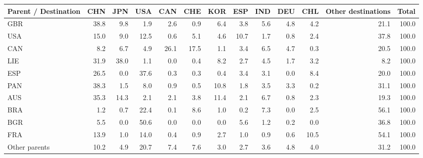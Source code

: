 \begin{tabular}{lrrrrrrrrrrrr}
\toprule
Parent / Destination & CHN & JPN & USA & CAN & CHE & KOR & ESP & IND & DEU & CHL & Other destinations & Total \\
\midrule
GBR & 38.8 & 9.8 & 1.9 & 2.6 & 0.9 & 6.4 & 3.8 & 5.6 & 4.8 & 4.2 & 21.1 & 100.0 \\
USA & 15.0 & 9.0 & 12.5 & 0.6 & 5.1 & 4.6 & 10.7 & 1.7 & 0.8 & 2.4 & 37.8 & 100.0 \\
CAN & 8.2 & 6.7 & 4.9 & 26.1 & 17.5 & 1.1 & 3.4 & 6.5 & 4.7 & 0.3 & 20.5 & 100.0 \\
LIE & 31.9 & 38.0 & 1.1 & 0.0 & 0.4 & 8.2 & 2.7 & 4.5 & 1.7 & 3.2 & 8.2 & 100.0 \\
ESP & 26.5 & 0.0 & 37.6 & 0.3 & 0.3 & 0.4 & 3.4 & 3.1 & 0.0 & 8.4 & 20.0 & 100.0 \\
PAN & 38.3 & 1.5 & 8.0 & 0.9 & 0.5 & 10.8 & 1.8 & 3.5 & 3.3 & 0.2 & 31.1 & 100.0 \\
AUS & 35.3 & 14.3 & 2.1 & 2.1 & 3.8 & 11.4 & 2.1 & 6.7 & 0.8 & 2.3 & 19.3 & 100.0 \\
BRA & 1.2 & 0.7 & 22.4 & 0.1 & 8.6 & 1.0 & 0.2 & 7.3 & 0.0 & 2.5 & 56.1 & 100.0 \\
BGR & 5.5 & 0.0 & 50.6 & 0.0 & 0.0 & 0.0 & 5.6 & 1.2 & 0.2 & 0.0 & 36.8 & 100.0 \\
FRA & 13.9 & 1.0 & 14.0 & 0.4 & 0.9 & 2.7 & 1.0 & 0.9 & 0.6 & 10.5 & 54.1 & 100.0 \\
Other parents & 10.2 & 4.9 & 20.7 & 7.4 & 7.6 & 3.0 & 2.7 & 3.6 & 4.8 & 4.0 & 31.2 & 100.0 \\
\bottomrule
\end{tabular}
